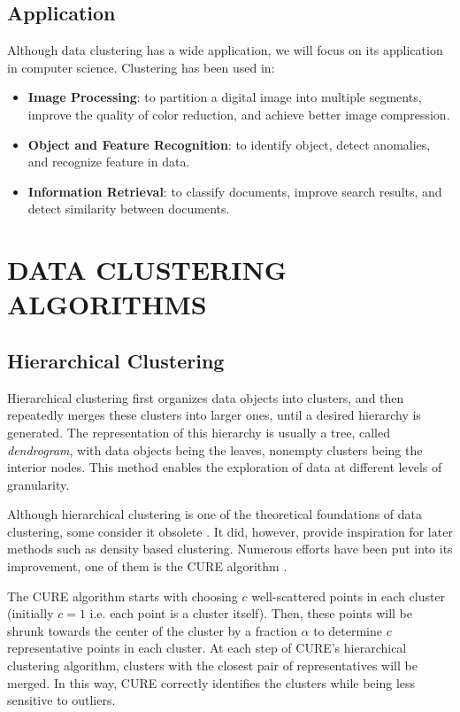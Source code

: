 \documentclass[conference]{IEEEtran}
\begin{document}
\subsection{Application}
Although data clustering has a wide application, we will focus on its application in computer science. Clustering has been used in:
\begin{itemize}
\item \textbf{Image Processing}: to partition a digital image into multiple segments, improve the quality of color reduction, and achieve better image compression.
\item \textbf{Object and Feature Recognition}: to identify object, detect anomalies, and recognize feature in data.
\item \textbf{Information Retrieval}: to classify documents, improve search results, and detect similarity between documents.
\end{itemize}

\section{DATA CLUSTERING ALGORITHMS}
\subsection{Hierarchical Clustering}
Hierarchical clustering first organizes data objects into clusters, and then repeatedly merges these clusters into larger ones, until a desired hierarchy is generated. The representation of this hierarchy is usually a tree, called \textit{dendrogram}, with data objects being the leaves, nonempty clusters being the interior nodes. This method enables the exploration of data at different levels of granularity.

Although hierarchical clustering is one of the theoretical foundations of data clustering, some consider it obsolete \cite{chowdary2014evaluating}. It did, however, provide inspiration for later methods such as density based clustering. Numerous efforts have been put into its improvement, one of them is the CURE algorithm \cite{guha1998cure}.

The CURE algorithm starts with choosing $c$ well-scattered points in each cluster (initially $c = 1$ i.e. each point is a cluster itself). Then, these points will be shrunk towards the center of the cluster by a fraction $\alpha$ to determine $c$ representative points in each cluster. At each step of CURE's hierarchical clustering algorithm, clusters with the closest pair of representatives will be merged. In this way, CURE correctly identifies the clusters while being less sensitive to outliers.
\end{document}
